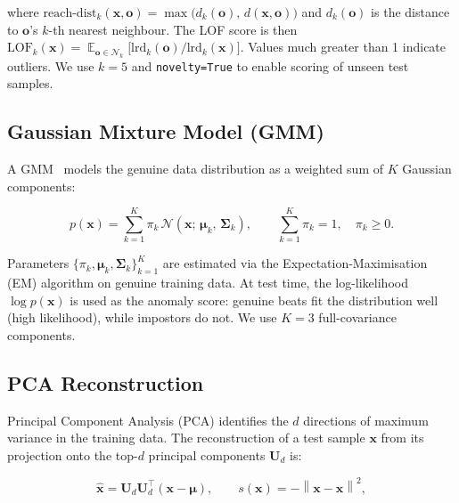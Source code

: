 \documentclass[12pt, a4paper]{article}
\DeclareMathOperator{\E}{\mathbb{E}}
\newcommand{\norm}[1]{\left\lVert#1\right\rVert}
\begin{document}
\noindent where
$\text{reach-dist}_k(\mathbf{x}, \mathbf{o}) = \max\bigl(d_k(\mathbf{o}),\,
d(\mathbf{x}, \mathbf{o})\bigr)$
and $d_k(\mathbf{o})$ is the distance to $\mathbf{o}$'s $k$-th nearest
neighbour.
The LOF score is then $\text{LOF}_k(\mathbf{x}) =
\E_{\mathbf{o} \in \mathcal{N}_k}\bigl[\text{lrd}_k(\mathbf{o}) /
\text{lrd}_k(\mathbf{x})\bigr]$.
Values much greater than 1 indicate outliers. We use $k = 5$ and
\texttt{novelty=True} to enable scoring of unseen test samples.

\subsection{Gaussian Mixture Model (GMM)}

A GMM~\cite{reynolds1995} models the genuine data distribution as a
weighted sum of $K$ Gaussian components:

\begin{mathbox}
\begin{equation}
  p(\mathbf{x})
  = \sum_{k=1}^{K} \pi_k\,
    \mathcal{N}\!\left(\mathbf{x};\, \boldsymbol{\mu}_k,\,
    \boldsymbol{\Sigma}_k\right),
  \qquad
  \sum_{k=1}^{K} \pi_k = 1,
  \quad \pi_k \geq 0.
  \label{eq:gmm}
\end{equation}
\end{mathbox}

Parameters $\{\pi_k, \boldsymbol{\mu}_k, \boldsymbol{\Sigma}_k\}_{k=1}^K$
are estimated via the Expectation-Maximisation (EM) algorithm on genuine
training data. At test time, the log-likelihood
$\log p(\mathbf{x})$ is used as the anomaly score: genuine beats
fit the distribution well (high likelihood), while impostors do not.
We use $K = 3$ full-covariance components.

\subsection{PCA Reconstruction}

Principal Component Analysis (PCA) identifies the $d$ directions of
maximum variance in the training data. The reconstruction of a test
sample $\mathbf{x}$ from its projection onto the top-$d$ principal
components $\mathbf{U}_d$ is:

\begin{mathbox}
\begin{equation}
  \hat{\mathbf{x}} = \mathbf{U}_d \mathbf{U}_d^\top (\mathbf{x} - \boldsymbol{\mu}),
  \qquad
  s(\mathbf{x}) = -\norm{\mathbf{x} - \hat{\mathbf{x}}}^2,
  \label{eq:pca_recon}
\end{equation}
\end{mathbox}
\end{document}
